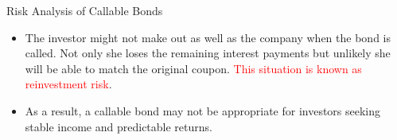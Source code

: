 \documentclass{beamer}
\begin{document}
\begin{frame}{Risk Analysis of Callable Bonds}
	\begin{itemize}
		\item<1-> The investor might not make out as well as the company when the bond is called. Not only she loses the remaining interest payments but unlikely she will be able to match the original coupon.
		\textcolor{red}{This situation is known as reinvestment risk}. 

		\item<2-> As a result, a callable bond may not be appropriate for investors seeking stable income and predictable returns.
	\end{itemize}
\end{frame}
		
%
%		
\end{document}
